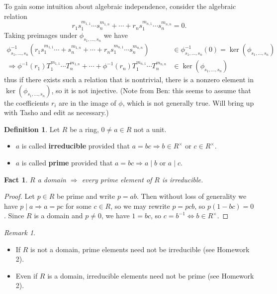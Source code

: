 \documentclass{amsart}
\newtheorem{fact}[thm]{Fact}
\theoremstyle{definition}
\newtheorem{defn}[thm]{Definition}
\theoremstyle{remark}
\newtheorem*{rmk}{Remark}
\begin{document}
To gain some intuition about algebraic independence, consider the algebraic relation
\[r_1s_1^{m_{1,1}} \cdots s_n^{m_{1, n}} + \cdots + r_ns_1^{m_{n, 1}} \cdots s_n^{m_{n, n}} = 0.\]
Taking preimages under $\phi_{s_1, ..., s_n}$ we have
\begin{align*}
\phi_{s_1, ..., s_n}^{-1}(r_1s_1^{m_{1,1}} \cdots + s_n^{m_{1, n}} + \cdots + r_ns_1^{m_{n, 1}} \cdots s_n^{m_{n, n}}) &\in \phi_{s_1, ..., s_n}^{-1}(0) = \ker(\phi_{s_1, ..., s_n}) \\
\Rightarrow \phi^{-1}(r_1)T_1^{m_{1,1}} \cdots T_n^{m_{1,n}} + \cdots + \phi^{-1}(r_n)T_1^{m_{n,1}} \cdots T_n^{m_{n,n}} &\in \ker(\phi_{s_1, ..., s_n})
\end{align*}
thus if there exists such a relation that is nontrivial, there is a nonzero element in $\ker(\phi_{s_1, ..., s_n})$, so it is not injective. (Note from Ben: this seems to assume that the coefficients $r_i$ are in the image of $\phi$, which is not generally true. Will bring up with Tasho and edit as necessary.)

\begin{defn}
Let $R$ be a ring, $0 \neq a \in R$ not a unit. \hspace{0.5cm}
\begin{itemize}
\item $a$ is called \textbf{irreducible} provided that $a = bc \Rightarrow b \in R^{\times}$ or $c \in R^{\times}$.
\item $a$ is called \textbf{prime} provided that $a = bc \Rightarrow a \mid b$ or $a \mid c$.
\end{itemize}
\end{defn}

\begin{fact}
$R$ a domain $\Rightarrow$ every prime element of $R$ is irreducible.
\end{fact}

\begin{proof}
Let $p \in R$ be prime and write $p = ab$. Then without loss of generality we have $p \mid a \Rightarrow a = pc$ for some $c \in R$, so we may rewrite $p = pcb$, so $p(1-bc) = 0$. Since $R$ is a domain and $p \neq 0$, we have $1 = bc$, so $c = b^{-1} \Leftrightarrow b \in R^{\times}$.
\end{proof}

\begin{rmk}
\hspace{0.5cm}
\begin{itemize}
\item If $R$ is not a domain, prime elements need not be irreducible (see Homework 2).
\item Even if $R$ is a domain, irreducible elements need not be prime (see Homework 2).
\end{itemize}
\end{rmk}
\end{document}
